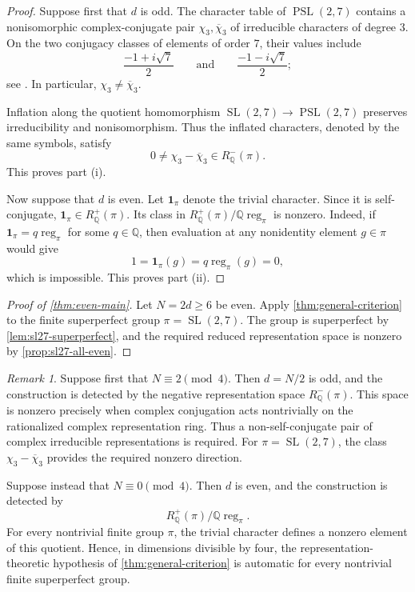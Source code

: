 \documentclass[10pt,reqno]{amsart}
\numberwithin{equation}{section}
\theoremstyle{definition}
\theoremstyle{remark}
\newtheorem{remark}{Remark}
\newcommand{\Q}{\mathbb Q}
\newcommand{\SL}{\operatorname{SL}}
\newcommand{\PSL}{\operatorname{PSL}}
\begin{document}
\begin{proof}
Suppose first that \(d\) is odd.  The character table of
\(\PSL(2,7)\) contains a nonisomorphic complex-conjugate pair
\(\chi_3,\overline{\chi}_3\) of irreducible characters of degree
\(3\).  On the two conjugacy classes of elements of order \(7\), their
values include
\[
\frac{-1+i\sqrt7}{2}
\qquad\text{and}\qquad
\frac{-1-i\sqrt7}{2};
\]
see \cite{Atlas}.  In particular,
\(\chi_3\neq\overline{\chi}_3\).

Inflation along the quotient homomorphism
\(\SL(2,7)\to\PSL(2,7)\) preserves irreducibility and
nonisomorphism.  Thus the inflated characters, denoted by the same
symbols, satisfy
\[
0\neq
\chi_3-\overline{\chi}_3
\in
R^-_{\Q}(\pi).
\]
This proves part \textup{(i)}.

Now suppose that \(d\) is even.  Let \(\mathbf1_\pi\) denote the
trivial character.  Since it is self-conjugate,
\(\mathbf1_\pi\in R^+_{\Q}(\pi)\).  Its class in
\(R^+_{\Q}(\pi)/\Q\operatorname{reg}_\pi\) is nonzero.  Indeed, if
\(\mathbf1_\pi=q\operatorname{reg}_\pi\) for some \(q\in\Q\), then
evaluation at any nonidentity element \(g\in\pi\) would give
\[
1
=
\mathbf1_\pi(g)
=
q\operatorname{reg}_\pi(g)
=
0,
\]
which is impossible.  This proves part \textup{(ii)}.
\end{proof}

\begin{proof}[Proof of \cref{thm:even-main}]
Let \(N=2d\geq6\) be even.  Apply
\cref{thm:general-criterion} to the finite superperfect group
\(\pi=\SL(2,7)\).  The group is superperfect by
\cref{lem:sl27-superperfect}, and the required reduced representation
space is nonzero by \cref{prop:sl27-all-even}.
\end{proof}

\begin{remark}\label{rem:mod-four-difference}
Suppose first that \(N\equiv2\pmod4\).  Then \(d=N/2\) is odd, and
the construction is detected by the negative representation space
\(R^-_{\Q}(\pi)\).  This space is nonzero precisely when complex
conjugation acts nontrivially on the rationalized complex
representation ring.  Thus a non-self-conjugate pair of complex
irreducible representations is required.  For
\(\pi=\SL(2,7)\), the class
\(\chi_3-\overline{\chi}_3\) provides the required nonzero direction.

Suppose instead that \(N\equiv0\pmod4\).  Then \(d\) is even, and
the construction is detected by
\[
R^+_{\Q}(\pi)/\Q\operatorname{reg}_\pi.
\]
For every nontrivial finite group \(\pi\), the trivial character
defines a nonzero element of this quotient.  Hence, in dimensions
divisible by four, the representation-theoretic hypothesis of
\cref{thm:general-criterion} is automatic for every nontrivial finite
superperfect group.
\end{remark}
\end{document}
